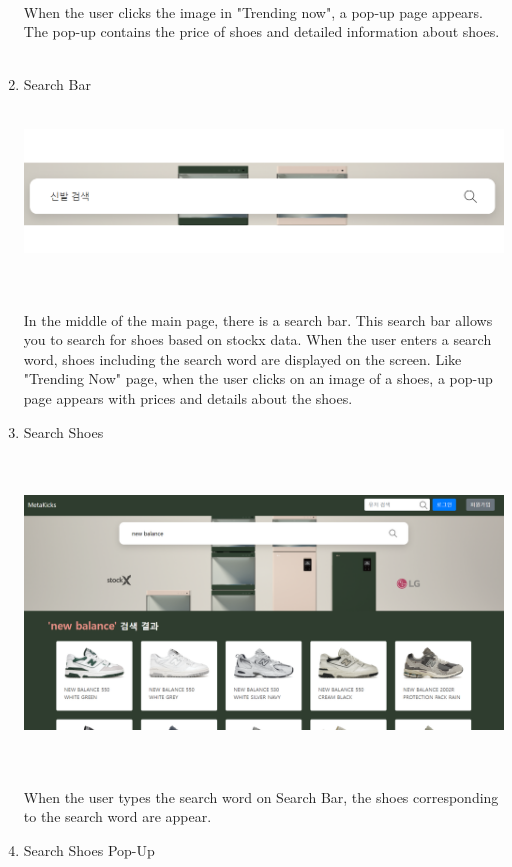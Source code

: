 \documentclass[conference]{IEEEtran}
\begin{document}
\begin{enumerate}
\\When the user clicks the image in "Trending now", a pop-up page appears. The pop-up contains the price of shoes and detailed information about shoes.\\\\
	\item Search Bar \\\\
\centerline{\includegraphics[scale=0.35]{pics/searchbar.png}}\\\\
In the middle of the main page, there is a search bar. This search bar allows you to search for shoes based on stockx data. When the user enters a search word, shoes including the search word are displayed on the screen. Like "Trending Now" page, when the user clicks on an image of a shoes, a pop-up page appears with prices and details about the shoes.\\
	\item Search Shoes \\\\
\\\centerline{\includegraphics[scale=0.24]{pics/search_screen.png}}\\\\
When the user types the search word on Search Bar, the shoes corresponding to the search word are appear.\\
	\item Search Shoes Pop-Up\\\\

\end{enumerate}
\end{document}

